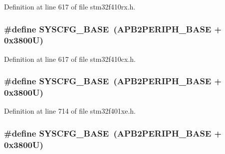 Definition at line 617 of file stm32f410rx.\+h.

\subsubsection[{\texorpdfstring{S\+Y\+S\+C\+F\+G\+\_\+\+B\+A\+SE}{SYSCFG_BASE}}]{\setlength{\rightskip}{0pt plus 5cm}\#define S\+Y\+S\+C\+F\+G\+\_\+\+B\+A\+SE~({\bf A\+P\+B2\+P\+E\+R\+I\+P\+H\+\_\+\+B\+A\+SE} + 0x3800\+U)}\hypertarget{group___peripheral__registers__structures_ga62246020bf3b34b6a4d8d0e84ec79d3d}{}\label{group___peripheral__registers__structures_ga62246020bf3b34b6a4d8d0e84ec79d3d}


Definition at line 617 of file stm32f410cx.\+h.

\subsubsection[{\texorpdfstring{S\+Y\+S\+C\+F\+G\+\_\+\+B\+A\+SE}{SYSCFG_BASE}}]{\setlength{\rightskip}{0pt plus 5cm}\#define S\+Y\+S\+C\+F\+G\+\_\+\+B\+A\+SE~({\bf A\+P\+B2\+P\+E\+R\+I\+P\+H\+\_\+\+B\+A\+SE} + 0x3800\+U)}\hypertarget{group___peripheral__registers__structures_ga62246020bf3b34b6a4d8d0e84ec79d3d}{}\label{group___peripheral__registers__structures_ga62246020bf3b34b6a4d8d0e84ec79d3d}


Definition at line 714 of file stm32f401xe.\+h.

\subsubsection[{\texorpdfstring{S\+Y\+S\+C\+F\+G\+\_\+\+B\+A\+SE}{SYSCFG_BASE}}]{\setlength{\rightskip}{0pt plus 5cm}\#define S\+Y\+S\+C\+F\+G\+\_\+\+B\+A\+SE~({\bf A\+P\+B2\+P\+E\+R\+I\+P\+H\+\_\+\+B\+A\+SE} + 0x3800\+U)}\hypertarget{group___peripheral__registers__structures_ga62246020bf3b34b6a4d8d0e84ec79d3d}{}\label{group___peripheral__registers__structures_ga62246020bf3b34b6a4d8d0e84ec79d3d}



